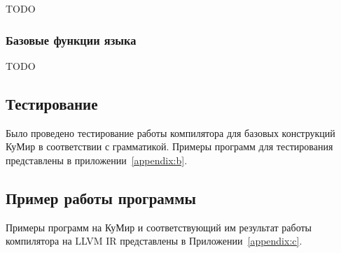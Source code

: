 TODO

\subsubsection*{Базовые функции языка}

TODO

\subsection{Тестирование}

Было проведено тестирование работы компилятора для базовых конструкций КуМир в соответствии с грамматикой. Примеры программ для тестирования представлены в приложении~\ref{appendix:b}.

\subsection{Пример работы программы}

Примеры программ на КуМир и соответствующий им результат работы компилятора на LLVM IR представлены в Приложении~\ref{appendix:c}.


\newpage
	